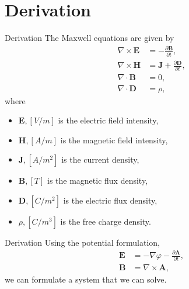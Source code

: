 \documentclass[aspectratio=43]{beamer}
\begin{document}
\section{Derivation}
\begin{frame}{Derivation}
The Maxwell equations are given by
\begin{align*}
    \nabla \times \mathbf{E} &= -\frac{\partial \mathbf{B}}{\partial t}, \\
    \nabla \times \mathbf{H} &=  \mathbf{J} + \frac{\partial \mathbf{D}}{\partial t}, \\
    \nabla \cdot \mathbf{B} &= 0, \\
    \nabla \cdot \mathbf{D} &= \rho,
\end{align*}
where
\begin{itemize}
    \item $\mathbf{E}, [V/m]$ is the electric field intensity,
    \item $\mathbf{H}, [A/m]$ is the magnetic field intensity,
    \item $\mathbf{J}, [A/m^2]$ is the current density,
    \item $\mathbf{B}, [T]$ is the magnetic flux density,
    \item $\mathbf{D}, [C/m^2]$ is the electric flux density,
    \item $\rho, [C/m^3]$ is the free charge density.
\end{itemize}
\end{frame}


\begin{frame}{Derivation}
Using the potential formulation,
\begin{align*}
    \mathbf{E} &= -\nabla \varphi -\frac{\partial \mathbf{A}}{\partial t}, \\
    \mathbf{B} &= \nabla \times \mathbf A,
\end{align*}
we can formulate a system that we can solve.

\end{frame}
\end{document}
